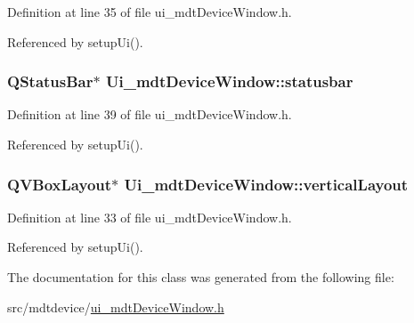 Definition at line 35 of file ui\-\_\-mdt\-Device\-Window.\-h.



Referenced by setup\-Ui().

\hypertarget{class_ui__mdt_device_window_a7a212839bf52a75a6a0213fa2fb9a307}{
\subsubsection[{statusbar}]{\setlength{\rightskip}{0pt plus 5cm}Q\-Status\-Bar$\ast$ Ui\-\_\-mdt\-Device\-Window\-::statusbar}}\label{class_ui__mdt_device_window_a7a212839bf52a75a6a0213fa2fb9a307}


Definition at line 39 of file ui\-\_\-mdt\-Device\-Window.\-h.



Referenced by setup\-Ui().

\hypertarget{class_ui__mdt_device_window_a93289e261d8474f5c3c627fd98e5618b}{
\subsubsection[{vertical\-Layout}]{\setlength{\rightskip}{0pt plus 5cm}Q\-V\-Box\-Layout$\ast$ Ui\-\_\-mdt\-Device\-Window\-::vertical\-Layout}}\label{class_ui__mdt_device_window_a93289e261d8474f5c3c627fd98e5618b}


Definition at line 33 of file ui\-\_\-mdt\-Device\-Window.\-h.



Referenced by setup\-Ui().



The documentation for this class was generated from the following file\-:\begin{DoxyCompactItemize}
\item 
src/mdtdevice/\hyperlink{ui__mdt_device_window_8h}{ui\-\_\-mdt\-Device\-Window.\-h}\end{DoxyCompactItemize}
